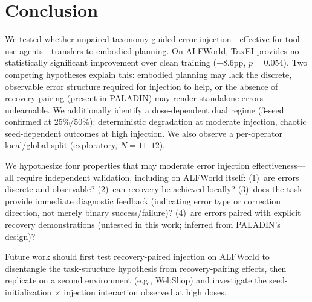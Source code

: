 \section{Conclusion}
\label{sec:conclusion}

We tested whether unpaired taxonomy-guided error injection---effective for tool-use agents---transfers to embodied planning. On ALFWorld, TaxEI provides no statistically significant improvement over clean training ($-8.6$pp, $p{=}0.054$). Two competing hypotheses explain this: embodied planning may lack the discrete, observable error structure required for injection to help, or the absence of recovery pairing (present in PALADIN) may render standalone errors unlearnable. We additionally identify a dose-dependent dual regime (3-seed confirmed at 25\%/50\%): deterministic degradation at moderate injection, chaotic seed-dependent outcomes at high injection. We also observe a per-operator local/global split (exploratory, $N{=}11$--$12$).

We hypothesize four properties that may moderate error injection effectiveness---all require independent validation, including on ALFWorld itself: (1)~are errors discrete and observable? (2)~can recovery be achieved locally? (3)~does the task provide immediate diagnostic feedback (indicating error type or correction direction, not merely binary success/failure)? (4)~are errors paired with explicit recovery demonstrations (untested in this work; inferred from PALADIN's design)?

Future work should first test recovery-paired injection on ALFWorld to disentangle the task-structure hypothesis from recovery-pairing effects, then replicate on a second environment (e.g., WebShop) and investigate the seed-initialization $\times$ injection interaction observed at high doses.
